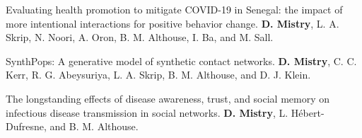 \begin{cventries}


  \cvpublicationentrytwo
    {Evaluating health promotion to mitigate COVID-19 in Senegal: the impact of more intentional interactions for positive behavior change.} %
    {\textbf{D. Mistry}, L. A. Skrip, N. Noori, A. Oron, B. M. Althouse, I. Ba, and M. Sall.} %
    {} %
    {} %
    {} %
    {} %
    {\hspace{-5mm}} %
    {} %
    {} %
    \vspace{1.5mm}
    
  \cvpublicationentrytwo
    {SynthPops: A generative model of synthetic contact networks.} %
    {\textbf{D. Mistry}, C. C. Kerr, R. G. Abeysuriya, L. A. Skrip, B. M. Althouse,  and D. J. Klein.} %
    {} %
    {} %
    {} %
    {} %
    {\hspace{-5mm}} %
    {} %
    {} %



  \cvpublicationentrytwo
    {The longstanding effects of disease awareness, trust, and social memory on infectious disease transmission in social networks.} %
    {\textbf{D. Mistry}, L. Hébert-Dufresne, and B. M. Althouse.} %
    {} %
    {} %
    {} %
    {} %
    {} %
    {} %
    {} %
    \vspace{1.5mm}


\end{cventries}